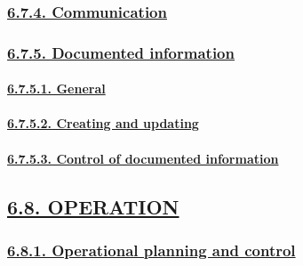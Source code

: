 \documentclass[
]{article}
\begin{document}
\hypertarget{communication}{%
\subsubsection{\texorpdfstring{\protect\hyperlink{communication-1}{6.7.4.
Communication}}{6.7.4. Communication}}\label{communication}}

\hypertarget{documented-information}{%
\subsubsection{\texorpdfstring{\protect\hyperlink{documented-information-1}{6.7.5.
Documented
information}}{6.7.5. Documented information}}\label{documented-information}}

\hypertarget{general-3}{%
\paragraph{\texorpdfstring{\protect\hyperlink{general-12}{6.7.5.1.
General}}{6.7.5.1. General}}\label{general-3}}

\hypertarget{creating-and-updating}{%
\paragraph{\texorpdfstring{\protect\hyperlink{creating-and-updating-1}{6.7.5.2.
Creating and
updating}}{6.7.5.2. Creating and updating}}\label{creating-and-updating}}

\hypertarget{control-of-documented-information}{%
\paragraph{\texorpdfstring{\protect\hyperlink{control-of-documented-information-1}{6.7.5.3.
Control of documented
information}}{6.7.5.3. Control of documented information}}\label{control-of-documented-information}}

\hypertarget{operation}{%
\subsection{\texorpdfstring{\protect\hyperlink{operation-1}{6.8.
OPERATION}}{6.8. OPERATION}}\label{operation}}

\hypertarget{operational-planning-and-control}{%
\subsubsection{\texorpdfstring{\protect\hyperlink{operational-planning-and-control-1}{6.8.1.
Operational planning and
control}}{6.8.1. Operational planning and control}}\label{operational-planning-and-control}}
\end{document}
